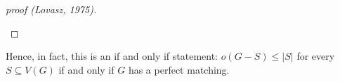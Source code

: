 \begin{proof}[proof (Lovasz, 1975)]
\begin{itemize}
    \end{itemize}
\end{proof}

\begin{remark}
    Hence, in fact, this is an if and only if statement: \(o(G - S) \le \vert S \vert \) for every \(S \subseteq V(G)\) if and only if \(G\) has a perfect matching.  
\end{remark}